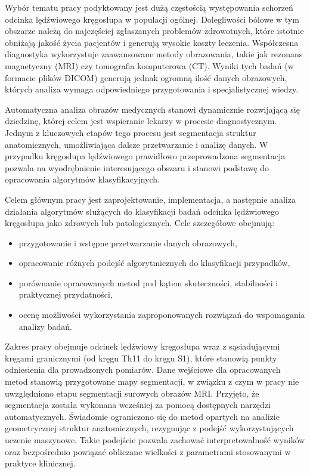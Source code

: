 Wybór tematu pracy podyktowany jest dużą częstością występowania schorzeń odcinka lędźwiowego kręgosłupa w populacji ogólnej. Dolegliwości bólowe w tym obszarze należą do najczęściej zgłaszanych problemów zdrowotnych, które istotnie obniżają jakość życia pacjentów i generują wysokie koszty leczenia. Współczesna diagnostyka wykorzystuje  zaawansowane metody obrazowania, takie jak rezonans magnetyczny (MRI) czy tomografia komputerowa (CT). Wyniki tych badań (w formacie plików DICOM) generują jednak ogromną ilość danych obrazowych, których analiza wymaga odpowiedniego przygotowania i specjalistycznej wiedzy.

Automatyczna analiza obrazów medycznych stanowi dynamicznie rozwijającą się dziedzinę, której celem jest wspieranie lekarzy w procesie diagnostycznym. Jednym z kluczowych etapów tego procesu jest segmentacja struktur anatomicznych, umożliwiająca dalsze przetwarzanie i analizę danych. W przypadku kręgosłupa lędźwiowego prawidłowo przeprowadzona segmentacja pozwala na wyodrębnienie interesującego obszaru i stanowi podstawę do opracowania algorytmów klasyfikacyjnych.

Celem głównym pracy jest zaprojektowanie, implementacja, a następnie analiza działania algorytmów służących do klasyfikacji badań odcinka lędźwiowego kręgosłupa jako zdrowych lub patologicznych.
Cele szczegółowe obejmują:
\begin{itemize}
    \item przygotowanie i wstępne przetwarzanie danych obrazowych,

    \item opracowanie różnych podejść algorytmicznych do klasyfikacji przypadków,

    \item porównanie opracowanych metod pod kątem skuteczności, stabilności i praktycznej przydatności,

    \item ocenę możliwości wykorzystania zaproponowanych rozwiązań do wspomagania analizy badań.
\end{itemize}

Zakres pracy obejmuje odcinek lędźwiowy kręgosłupa wraz z sąsiadującymi kręgami granicznymi (od kręgu Th11 do kręgu S1), które stanowią punkty odniesienia dla prowadzonych pomiarów.
Dane wejściowe dla opracowanych metod stanowią przygotowane mapy segmentacji, w związku z czym w  pracy nie uwzględniono etapu segmentacji surowych obrazów MRI. Przyjęto, że segmentacja została wykonana wcześniej za pomocą dostępnych narzędzi automatycznych.
Świadomie ograniczono się do metod opartych na analizie geometrycznej struktur anatomicznych, rezygnując z podejść wykorzystujących uczenie maszynowe.
Takie podejście pozwala zachować interpretowalność wyników oraz bezpośrednio powiązać obliczane wielkości z parametrami stosowanymi w praktyce klinicznej.

